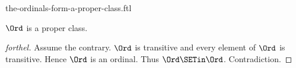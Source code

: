 \documentclass{naproche-library}
\begin{document}
\begin{smodule}[title=The Ordinals Form a Proper Class -- Burali-Forti's Paradox]{the-ordinals-form-a-proper-class.ftl}
  
\begin{theorem}[forthel,title=Burali-Forti's Paradox,id=burali_forti_paradox]
  $\Ord$ is a proper class.
\end{theorem}
\begin{proof}[forthel]
  Assume the contrary.
  $\Ord$ is transitive and every element of $\Ord$ is transitive.
  Hence $\Ord$ is an ordinal.
  Thus $\Ord \SETin \Ord$.
  Contradiction.
\end{proof}
\end{smodule}
\end{document}
